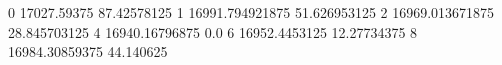 0 17027.59375 87.42578125
1 16991.794921875 51.626953125
2 16969.013671875 28.845703125
4 16940.16796875 0.0
6 16952.4453125 12.27734375
8 16984.30859375 44.140625
